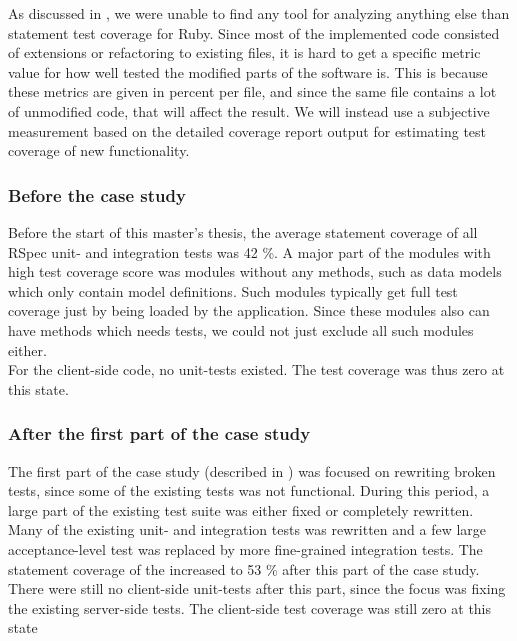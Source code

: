 
As discussed in , we were unable to find
any tool for analyzing anything else than statement test coverage for
Ruby. Since most of the implemented code consisted of extensions or
refactoring to existing files, it is hard to get a specific metric value
for how well tested the modified parts of the software is. This is
because these metrics are given in percent per file, and since the same
file contains a lot of unmodified code, that will affect the result. We
will instead use a subjective measurement based on the detailed coverage
report output for estimating test coverage of new functionality.\\


\subsubsection{Before the case study}

Before the start of this master's thesis, the average statement coverage
of all RSpec unit- and integration tests was 42 \%. A major part of
the modules with high test coverage score was modules without any
methods, such as data models which only contain model definitions. Such
modules typically get full test coverage just by being loaded by the
application. Since these modules also can have methods which needs
tests, we could not just exclude all such modules either.\\

For the client-side code, no unit-tests existed. The test coverage was
thus zero at this state.\\


\subsubsection{After the first part of the case study}

The first part of the case study (described in )
was focused on rewriting broken tests, since some of the existing tests
was not functional. During this period, a large part of the existing
test suite was either fixed or completely rewritten. Many of the
existing unit- and integration tests was rewritten and a few large
acceptance-level test was replaced by more fine-grained integration
tests. The statement coverage of the increased to 53 \% after this
part of the case study.\\

There were still no client-side unit-tests after this part, since the
focus was fixing the existing server-side tests. The client-side test
coverage was still zero at this state \\

